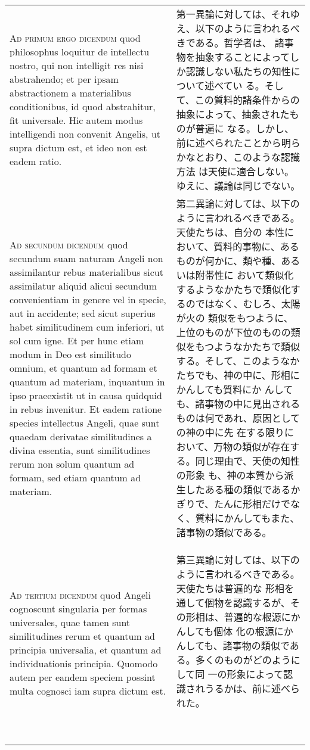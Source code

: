 \documentclass[10pt]{jsarticle} %
\begin{document}
\begin{longtable}{p{21em}p{21em}}
\\


{\scshape Ad primum ergo dicendum} quod philosophus loquitur de
intellectu nostro, qui non intelligit res nisi abstrahendo; et per
ipsam abstractionem a materialibus conditionibus, id quod abstrahitur,
fit universale. Hic autem modus intelligendi non convenit Angelis, ut
supra dictum est, et ideo non est eadem ratio.


&

第一異論に対しては、それゆえ、以下のように言われるべきである。哲学者は、
諸事物を抽象することによってしか認識しない私たちの知性について述べてい
る。そして、この質料的諸条件からの抽象によって、抽象されたものが普遍に
なる。しかし、前に述べられたことから明らかなとおり、このような認識方法
は天使に適合しない。ゆえに、議論は同じでない。


\\


{\scshape Ad secundum dicendum} quod secundum suam naturam Angeli non
assimilantur rebus materialibus sicut assimilatur aliquid alicui
secundum convenientiam in genere vel in specie, aut in accidente; sed
sicut superius habet similitudinem cum inferiori, ut sol cum igne. Et
per hunc etiam modum in Deo est similitudo omnium, et quantum ad
formam et quantum ad materiam, inquantum in ipso praeexistit ut in
causa quidquid in rebus invenitur. Et eadem ratione species
intellectus Angeli, quae sunt quaedam derivatae similitudines a divina
essentia, sunt similitudines rerum non solum quantum ad formam, sed
etiam quantum ad materiam.


&

第二異論に対しては、以下のように言われるべきである。天使たちは、自分の
本性において、質料的事物に、あるものが何かに、類や種、あるいは附帯性に
おいて類似化するようなかたちで類似化するのではなく、むしろ、太陽が火の
類似をもつように、上位のものが下位のものの類似をもつようなかたちで類似
する。そして、このようなかたちでも、神の中に、形相にかんしても質料にか
んしても、諸事物の中に見出されるものは何であれ、原因としての神の中に先
在する限りにおいて、万物の類似が存在する。同じ理由で、天使の知性の形象
も、神の本質から派生したある種の類似であるかぎりで、たんに形相だけでな
く、質料にかんしてもまた、諸事物の類似である。


\\


{\scshape Ad tertium dicendum} quod Angeli cognoscunt singularia per
formas universales, quae tamen sunt similitudines rerum et quantum ad
principia universalia, et quantum ad individuationis
principia. Quomodo autem per eandem speciem possint multa cognosci iam
supra dictum est.


&

第三異論に対しては、以下のように言われるべきである。天使たちは普遍的な
形相を通して個物を認識するが、その形相は、普遍的な根源にかんしても個体
化の根源にかんしても、諸事物の類似である。多くのものがどのようにして同
一の形象によって認識されうるかは、前に述べられた。


\

\end{longtable}
\newpage
\end{document}
